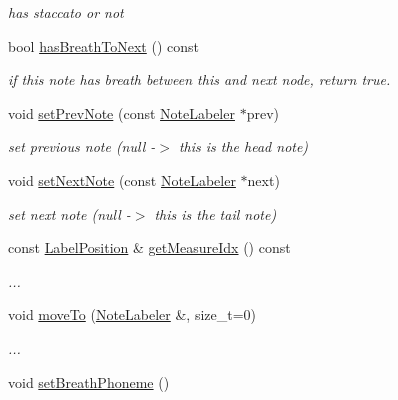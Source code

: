 \begin{DoxyCompactItemize}
\begin{DoxyCompactList}\small\item\em has staccato or not \end{DoxyCompactList}\item 
bool \hyperlink{classsinsy_1_1NoteLabeler_a967b7e5375d754eed4df1a123b06ac91}{has\-Breath\-To\-Next} () const 
\begin{DoxyCompactList}\small\item\em if this note has breath between this and next node, return true. \end{DoxyCompactList}\item 
\hypertarget{classsinsy_1_1NoteLabeler_a8582f7667aec7650595d3e040f47b946}{void \hyperlink{classsinsy_1_1NoteLabeler_a8582f7667aec7650595d3e040f47b946}{set\-Prev\-Note} (const \hyperlink{classsinsy_1_1NoteLabeler}{\-Note\-Labeler} $\ast$prev)}\label{classsinsy_1_1NoteLabeler_a8582f7667aec7650595d3e040f47b946}

\begin{DoxyCompactList}\small\item\em set previous note (null -\/$>$ this is the head note) \end{DoxyCompactList}\item 
\hypertarget{classsinsy_1_1NoteLabeler_a4dbe152f588f27032b014279fe6fc91b}{void \hyperlink{classsinsy_1_1NoteLabeler_a4dbe152f588f27032b014279fe6fc91b}{set\-Next\-Note} (const \hyperlink{classsinsy_1_1NoteLabeler}{\-Note\-Labeler} $\ast$next)}\label{classsinsy_1_1NoteLabeler_a4dbe152f588f27032b014279fe6fc91b}

\begin{DoxyCompactList}\small\item\em set next note (null -\/$>$ this is the tail note) \end{DoxyCompactList}\item 
const \hyperlink{classsinsy_1_1LabelPosition}{\-Label\-Position} \& \hyperlink{classsinsy_1_1NoteLabeler_af3687d74b7cff50bd6797d5a77e54163}{get\-Measure\-Idx} () const 
\begin{DoxyCompactList}\small\item\em ... \end{DoxyCompactList}\item 
void \hyperlink{classsinsy_1_1NoteLabeler_acafb879727f06489887e3177ce15f8a3}{move\-To} (\hyperlink{classsinsy_1_1NoteLabeler}{\-Note\-Labeler} \&, size\-\_\-t=0)
\begin{DoxyCompactList}\small\item\em ... \end{DoxyCompactList}\item 
\hypertarget{classsinsy_1_1NoteLabeler_ad2d131247f0b2bfa19e4bbc9ab323006}{void \hyperlink{classsinsy_1_1NoteLabeler_ad2d131247f0b2bfa19e4bbc9ab323006}{set\-Breath\-Phoneme} ()}\label{classsinsy_1_1NoteLabeler_ad2d131247f0b2bfa19e4bbc9ab323006}


\end{DoxyCompactItemize}
